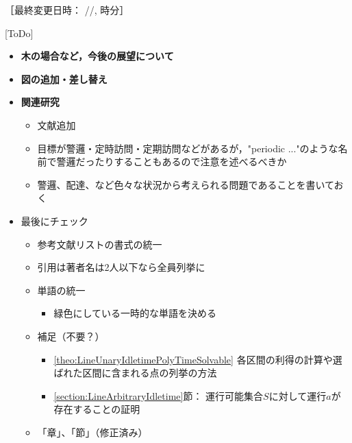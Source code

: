 ［最終変更日時：
{\the\year/\the\month/\the\day, {\the\hour} 時{\the\minute}分}］

 [ToDo]
\begin{itemize}
  \item \textbf{木の場合など，今後の展望について}
  \item \textbf{図の追加・差し替え}
  \item \textbf{関連研究}
  \begin{itemize}
    \item 文献追加
    \item 目標が警邏・定時訪問・定期訪問などがあるが，"periodic ..."のような名前で警邏だったりすることもあるので注意を述べるべきか
    \item 警邏、配達、など色々な状況から考えられる問題であることを書いておく
  \end{itemize}
  \item 最後にチェック
  \begin{itemize}
    \item 参考文献リストの書式の統一
    \item 引用は著者名は2人以下なら全員列挙に
    \item 単語の統一
    \begin{itemize}
      \item 緑色にしている一時的な単語を決める
    \end{itemize}
    \item 補足（不要？）
    \begin{itemize}
      \item \ref{theo:LineUnaryIdletimePolyTimeSolvable}
        各区間の利得の計算や選ばれた区間に含まれる点の列挙の方法
      \item \ref{section:LineArbitraryIdletime}節：
        運行可能集合$S$に対して運行$a$が存在することの証明
    \end{itemize}
    \item 「章」、「節」（修正済み）
  \end{itemize}
\end{itemize}
